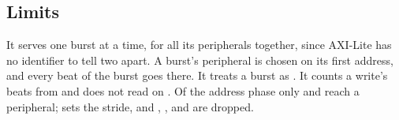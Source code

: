 \subsection*{Limits}

It serves one burst at a time, for all its peripherals together, since
AXI-Lite has no identifier to tell two apart. A burst's peripheral is
chosen on its first address, and every beat of the burst goes there.
It treats a  burst as . It counts a write's beats
from  and does not read  on . Of the
address phase only  and  reach a peripheral;
 sets the stride, and , ,
 and  are dropped.
